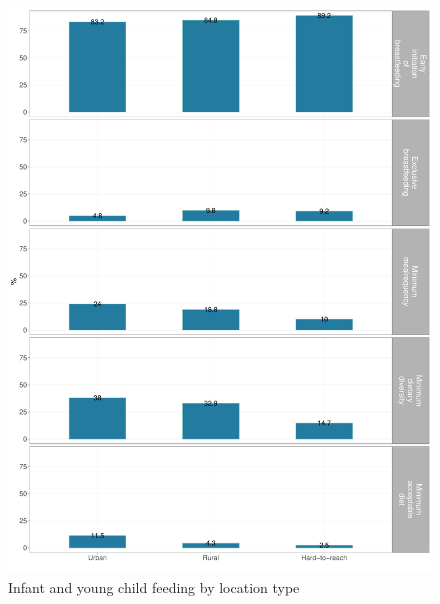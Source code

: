 \documentclass[12pt,a4paper]{article}
\begin{document}
\begin{figure}[H]

{\centering \includegraphics{kayinReport_files/figure-latex/iycf1plot-1} 

}

\caption{Infant and young child feeding by location type}\label{fig:iycf1plot}
\end{figure}
\end{document}
